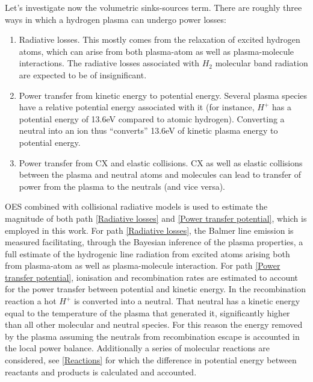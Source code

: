 Let’s investigate now the volumetric sinks-sources term. There are roughly three ways in which a hydrogen plasma can undergo power losses:
\begin{enumerate}
    \item Radiative losses. This mostly comes from the relaxation of excited hydrogen atoms, which can arise from both plasma-atom as well as plasma-molecule interactions. The radiative losses associated with $H_2$ molecular band radiation are expected to be of insignificant.\cite{Groth2019} \label{Radiative losses}
    \item Power transfer from kinetic energy to potential energy. Several plasma species have a relative potential energy associated with it (for instance, $H^+$ has a potential energy of 13.6eV compared to atomic hydrogen). Converting a neutral into an ion thus “converts” 13.6eV of kinetic plasma energy to potential energy.  \label{Power transfer potential}
    \item Power transfer from CX and elastic collisions. CX as well as elastic collisions between the plasma and neutral atoms and molecules can lead to transfer of power from the plasma to the neutrals (and vice versa). \label{Power transfer CX}
\end{enumerate}

OES combined with collisional radiative models is used to estimate the magnitude of both path \ref{Radiative losses} and \ref{Power transfer potential}, which is employed in this work. For path \ref{Radiative losses}, the Balmer line emission is measured facilitating, through the Bayesian inference of the plasma properties, a full estimate of the hydrogenic line radiation from excited atoms arising both from plasma-atom as well as plasma-molecule interaction. For path \ref{Power transfer potential}, ionisation and recombination rates are estimated to account for the power transfer between potential and kinetic energy. In the recombination reaction a hot $H^+$ is converted into a neutral. That neutral has a kinetic energy equal to the temperature of the plasma that generated it, significantly higher than all other molecular and neutral species. For this reason the energy removed by the plasma assuming the neutrals from recombination escape is accounted in the local power balance. Additionally a series of molecular reactions are considered, see \autoref{Reactions} for which the difference in potential energy between reactants and products is calculated and accounted.

